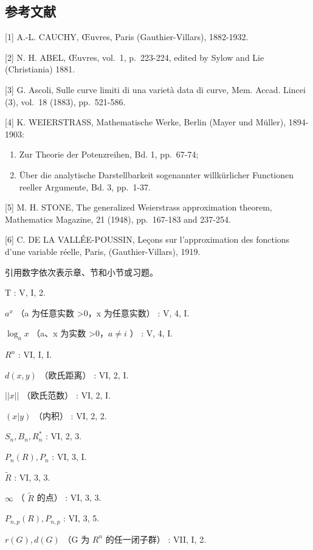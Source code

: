 \subsection*{参考文献}

{[}1{]} A.-L. CAUCHY, Œuvres, Paris (Gauthier-Villars), 1882-1932.

{[}2{]} N. H. ABEL, Œuvres, vol.~1, p.~223-224, edited by Sylow and Lie (Christiania) 1881.

{[}3{]} G. Ascoli, Sulle curve limiti di una varietà data di curve, Mem. Accad. Lincei (3), vol.~18 (1883), pp.~521-586.

{[}4{]} K. WEIERSTRASS, Mathematische Werke, Berlin (Mayer und Müller), 1894-1903:

\begin{enumerate}
\def\labelenumi{\alph{enumi})}
\item
  Zur Theorie der Potenzreihen, Bd. 1, pp.~67-74;
\item
  Über die analytische Darstellbarkeit sogenannter willkürlicher Functionen reeller Argumente, Bd. 3, pp.~1-37.
\end{enumerate}

{[}5{]} M. H. STONE, The generalized Weierstrass approximation theorem, Mathematics Magazine, 21 (1948), pp.~167-183 and 237-254.

{[}6{]} C. DE LA VALLÉE-POUSSIN, Leçons sur l'approximation des fonctions d'une variable réelle, Paris, (Gauthier-Villars), 1919.

引用数字依次表示章、节和小节或习题。

T : V, I, 2.

\(a^{x}\) （a 为任意实数 \textgreater0，x 为任意实数） : V, 4, I.

\(\log_{a}x\) （a、x 为实数 \textgreater0，\(a \neq i\) ） : V, 4, I.

\(R^{n}\) : VI, I, I.

\(d(x, y)\) （欧氏距离） : VI, 2, I.

\(||x||\) （欧氏范数） : VI, 2, I.

\((x|y)\) （内积） : VI, 2, 2.

\(S_{n}, B_{n}, R_{n}^{*}\) : VI, 2, 3.

\(P_{n}(R), P_{n}\) : VI, 3, I.

\(\tilde{R}\) : VI, 3, 3.

\(\infty\) （ \(\tilde{R}\) 的点） : VI, 3, 3.

\(P_{n,p}(R), P_{n,p}\) : VI, 3, 5.

\(r(G), d(G)\) （G 为 \(R^{n}\) 的任一闭子群） : VII, I, 2.

